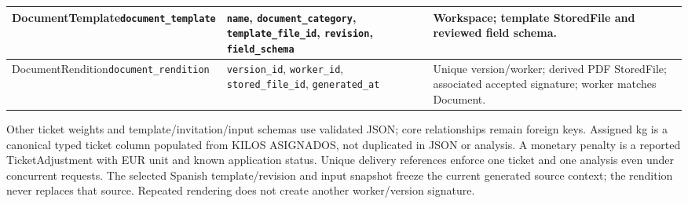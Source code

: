 {\begin{longtable}{L{0.27}L{0.4}L{0.33}}
\midrule
DocumentTemplate\newline \texttt{document\_\allowbreak{}template} & \mbox{\texttt{name}}, \mbox{\texttt{document\_category}}, \mbox{\texttt{template\_file\_id}}, \mbox{\texttt{revision}}, \mbox{\texttt{field\_schema}} & Workspace; template StoredFile and reviewed field schema. \\
\midrule
DocumentRendition\newline \texttt{document\_\allowbreak{}rendition} & \mbox{\texttt{version\_id}}, \mbox{\texttt{worker\_id}}, \mbox{\texttt{stored\_file\_id}}, \mbox{\texttt{generated\_at}} & Unique version/worker; derived PDF StoredFile; associated accepted signature; worker matches Document. \\
\end{longtable}}

Other ticket weights and template/invitation/input schemas use validated JSON;
core relationships remain foreign keys. Assigned kg is a canonical typed ticket column populated from KILOS ASIGNADOS, not duplicated in JSON or analysis. A monetary penalty is a reported
TicketAdjustment with EUR unit and known application status. Unique delivery
references enforce one ticket and one analysis even under concurrent requests.
The selected Spanish template/revision and input snapshot freeze the current generated source context;
the rendition never replaces that source. Repeated rendering does not create
another worker/version signature.
